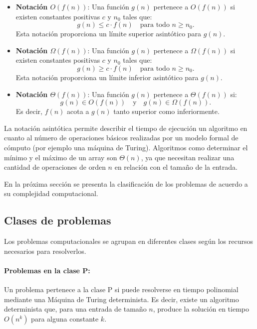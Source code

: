 \documentclass[12pt]{article}
\begin{document}
\begin{itemize}
      \item \textbf{Notación $O(f(n))$}: Una función $g(n)$ pertenece a $O(f(n))$ si existen constantes positivas $c$ y $n_0$ tales que:
            \[
                  g(n) \leq c \cdot f(n) \quad \text{para todo } n \geq n_0.
            \]
            Esta notación proporciona un límite superior asintótico para $g(n)$.
            
      \item \textbf{Notación $\Omega(f(n))$}: Una función $g(n)$ pertenece a $\Omega(f(n))$ si existen constantes positivas $c$ y $n_0$ tales que:
            \[
                  g(n) \geq c \cdot f(n) \quad \text{para todo } n \geq n_0.
            \]
            Esta notación proporciona un límite inferior asintótico para $g(n)$.
            
      \item \textbf{Notación $\Theta(f(n))$}: Una función $g(n)$ pertenece a $\Theta(f(n))$ si:
            \[
                  g(n) \in O(f(n)) \quad \text{y} \quad g(n) \in \Omega(f(n)).
            \]
            Es decir, $f(n)$ acota a $g(n)$ tanto superior como inferiormente.
\end{itemize}

La notación asintótica permite describir el tiempo de ejecución un algoritmo en cuanto al número de operaciones básicos realizadas
por un modelo formal de cómputo (por ejemplo una máquina de Turing). Algoritmos como determinar el mínimo y el máximo de
un array son $\Theta(n)$, ya que necesitan realizar una cantidad de operaciones de orden $n$ en relación con el tamaño de la entrada.

En la próxima sección se presenta la clasificación de los problemas de acuerdo a su complejidad computacional.
\subsection{Clases de problemas}

Los problemas computacionales \cite{authomataTheory} se agrupan en diferentes clases según los recursos necesarios para resolverlos.

\paragraph{Problemas en la clase P:}
Un problema pertenece a la clase P si puede resolverse en tiempo polinomial mediante una Máquina de Turing determinista. Es decir, existe un algoritmo determinista que, para una entrada de tamaño $n$, produce la solución en tiempo $O(n^k)$ para alguna constante $k$.
\end{document}
